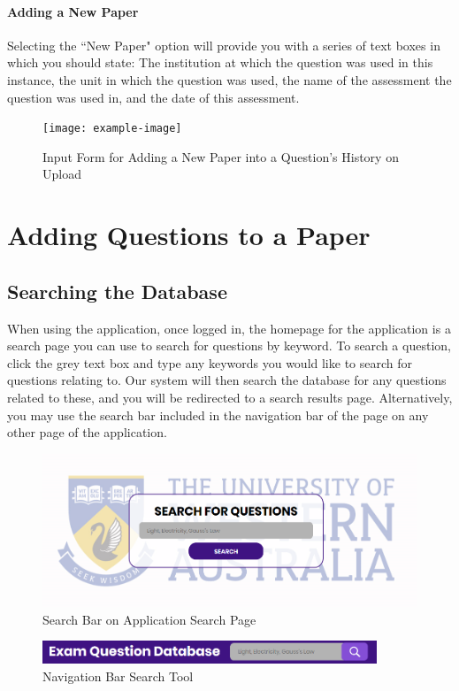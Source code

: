 \documentclass[12pt, a4paper, titlepage]{book}
\begin{document}
\subsubsection{Adding a New Paper}
Selecting the ``New Paper" option will provide you with a series of text boxes in which you should state: The institution at which the question was used in this instance, the unit in which the question was used, the name of the assessment the question was used in, and the date of this assessment.
\begin{figure}[htp]
\centering
\texttt{[image: example-image]}
\caption{Input Form for Adding a New Paper into a Question's History on Upload}
\end{figure}

\chapter{Adding Questions to a Paper} \label{ch:qadd}
\section{Searching the Database}
When using the application, once logged in, the homepage for the application is a search page you can use to search for questions by keyword. To search a question, click the grey text box and type any keywords you would like to search for questions relating to. Our system will then search the database for any questions related to these, and you will be redirected to a search results page. Alternatively, you may use the search bar included in the navigation bar of the page on any other page of the application.
\begin{figure}[htp]
\centering
\includegraphics[width =12cm]{SearchPage.PNG}
\caption{Search Bar on Application Search Page}
\end{figure}
\begin{figure}[htp]
\centering
\includegraphics[width =10cm]{PagetopSearch.PNG}
\caption{Navigation Bar Search Tool}
\end{figure}
\end{document}

